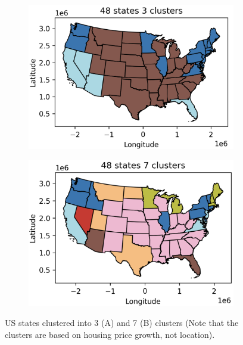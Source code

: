 \documentclass[11pt]{amsart}
\begin{document}
\begin{figure}[h]
    \centering
    \begin{subfigure}{0.45\textwidth}
        \centering
        \includegraphics[width=\linewidth]{figures/3clusters.png}
        \caption{}
        \label{fig:Cluster3}
    \end{subfigure}
    \hfill
    \begin{subfigure}{0.45\textwidth}
        \centering
        \includegraphics[width=\linewidth]{figures/7clusters.png}
        \caption{}
        \label{fig:Cluster7}
    \end{subfigure}
    \caption{US states clustered into 3 (A) and 7 (B) clusters (Note that the clusters are based on housing price growth, not location).}
    \label{fig:clusters}
\end{figure}
\end{document}
